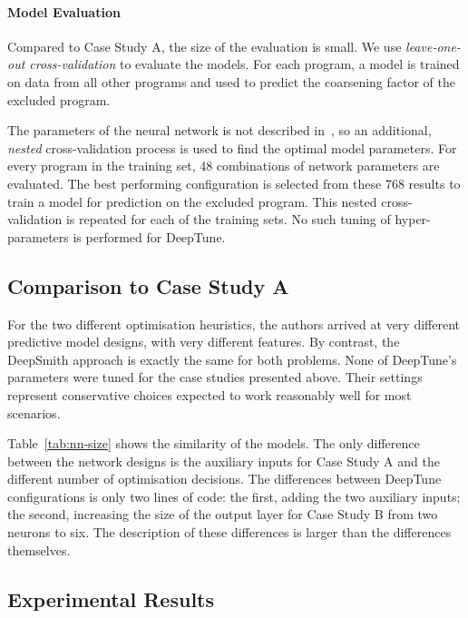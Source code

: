 \paragraph*{Model Evaluation}

Compared to Case Study A, the size of the evaluation is small. We use \emph{leave-one-out cross-validation} to evaluate the models. For each program, a model is trained on data from all other programs and used to predict the coarsening factor of the excluded program.

The parameters of the neural network is not described in~\cite{Magni2014}, so an additional, \emph{nested} cross-validation process is used to find the optimal model parameters. For every program in the training set, 48 combinations of network parameters are evaluated. The best performing configuration is selected from these 768 results to train a model for prediction on the excluded program. This nested cross-validation is repeated for each of the training sets. No such tuning of hyper-parameters is performed for DeepTune.


\subsection{Comparison to Case Study A}

For the two different optimisation heuristics, the authors arrived at very different predictive model designs, with very different features. By contrast, the DeepSmith approach is exactly the same for both problems. None of DeepTune's parameters were tuned for the case studies presented above. Their settings represent conservative choices expected to work reasonably well for most scenarios.

Table~\ref{tab:nn-size} shows the similarity of the models. The only difference between the network designs is the auxiliary inputs for Case Study A and the different number of optimisation decisions. The differences between DeepTune configurations is only two lines of code: the first, adding the two auxiliary inputs; the second, increasing the size of the output layer for Case Study B from two neurons to six. The description of these differences is larger than the differences themselves.




\subsection{Experimental Results}


